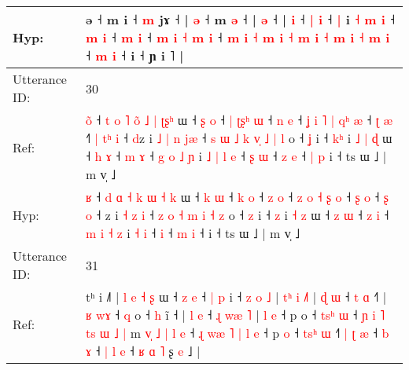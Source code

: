 \documentclass[10pt]{article}
\DeclareRobustCommand{\hl}[1]{{\textcolor{red}{#1}}}
\begin{document}
\begin{longtable}{ll}
Hyp: & ə ˧ m i ˧\hl{}\hl{} \hl{m} jɤ ˧\hl{}\hl{}\hl{}\hl{}\hl{} |\hl{}\hl{} \hl{}\hl{ə} ˧ m \hl{ə} ˧ |\hl{}\hl{}\hl{}\hl{}\hl{}\hl{}\hl{}\hl{} \hl{}\hl{ə} ˧\hl{}\hl{}\hl{}\hl{}\hl{}\hl{}\hl{} |\hl{}\hl{}\hl{}\hl{} \hl{i} ˧ \hl{|} \hl{i} ˧ \hl{|} i\hl{}\hl{} \hl{˧} \hl{m} \hl{i} ˧ \hl{m} \hl{i} ˧ \hl{m} \hl{i} ˧\hl{}\hl{} \hl{m} \hl{i} \hl{˧} \hl{}\hl{m} \hl{i} ˧ \hl{m} \hl{i} \hl{˧} \hl{}\hl{}\hl{m} \hl{i} \hl{˧} \hl{}\hl{}\hl{m} \hl{i} \hl{˧} \hl{}\hl{m} \hl{i} \hl{˧} \hl{m} \hl{i} ˧ \hl{}\hl{m} \hl{i} ˧\hl{}\hl{} i ˧ ɲ i ˥ |
 \\
\midrule
Utterance ID: & 30 \\
Ref: & \hl{o}\hl{̃} ˧ \hl{t} \hl{o} \hl{˥} \hl{o}\hl{̃} \hl{˩} \hl{|} \hl{ʈ}\hl{ʂ}\hl{ʰ} ɯ ˧ \hl{ʂ} \hl{o} ˧\hl{ }\hl{|} \hl{ʈ}\hl{ʂ}\hl{ʰ} \hl{ɯ} ˧ \hl{n} \hl{e} ˧\hl{ }\hl{ʝ} \hl{i} \hl{˥} \hl{|} \hl{q}\hl{ʰ} \hl{æ} ˧ \hl{ʈ} \hl{æ} ˧\hl{˥}\hl{ }\hl{|} \hl{t}\hl{ʰ} \hl{i} ˧ \hl{d}z i\hl{ }\hl{˩} \hl{|} \hl{n} \hl{j}\hl{æ} ˧\hl{ }\hl{s} \hl{ɯ} \hl{˩} \hl{k} \hl{v}\hl{̩} \hl{˩} \hl{|} \hl{l} o ˧ \hl{ʝ} i ˧ \hl{k}\hl{ʰ} i\hl{ }\hl{˩} \hl{|} \hl{ɖ} ɯ ˧ \hl{h} \hl{ɤ} ˧ \hl{m} \hl{ɤ} ˧ \hl{g} \hl{o} \hl{˩} \hl{ɲ} i\hl{ }\hl{˩}\hl{ }\hl{|} \hl{l} \hl{e} ˧\hl{ }\hl{ʂ} \hl{ɯ} ˧ \hl{z} \hl{e} ˧\hl{ }\hl{|}\hl{ }\hl{p} i ˧ ts ɯ ˩ | m v̩ ˩
 \\
Hyp: & \hl{}\hl{ʁ} ˧ \hl{d} \hl{ɑ} \hl{˧} \hl{}\hl{k} \hl{ɯ} \hl{˧} \hl{}\hl{}\hl{k} ɯ ˧ \hl{k} \hl{ɯ} ˧\hl{}\hl{} \hl{}\hl{}\hl{k} \hl{o} ˧ \hl{z} \hl{o} ˧\hl{}\hl{} \hl{z} \hl{o} \hl{˧} \hl{}\hl{ʂ} \hl{o} ˧ \hl{ʂ} \hl{o} ˧\hl{}\hl{}\hl{} \hl{}\hl{ʂ} \hl{o} ˧ \hl{}z i\hl{}\hl{} \hl{˧} \hl{z} \hl{}\hl{i} ˧\hl{}\hl{} \hl{z} \hl{o} \hl{˧} \hl{}\hl{m} \hl{i} \hl{˧} \hl{z} o ˧ \hl{z} i ˧ \hl{}\hl{z} i\hl{}\hl{} \hl{˧} \hl{z} ɯ ˧ \hl{z} \hl{ɯ} ˧ \hl{z} \hl{i} ˧ \hl{m} \hl{i} \hl{˧} \hl{z} i\hl{}\hl{}\hl{}\hl{} \hl{˧} \hl{i} ˧\hl{}\hl{} \hl{i} ˧ \hl{m} \hl{i} ˧\hl{}\hl{}\hl{}\hl{} i ˧ ts ɯ ˩ | m v̩ ˩
 \\
\midrule
Utterance ID: & 31 \\
Ref: & tʰ i ˩˥ |\hl{ }\hl{l}\hl{ }\hl{e} \hl{˧}\hl{ }\hl{ʂ} ɯ ˧ \hl{z} \hl{e} ˧ \hl{|}\hl{ }\hl{p} i ˧ \hl{z} \hl{o} \hl{˩} |\hl{ }\hl{t}\hl{ʰ} \hl{i} \hl{˩}\hl{˥} |\hl{ }\hl{ɖ} \hl{ɯ} ˧ \hl{t} \hl{ɑ} ˧\hl{˥} |\hl{ }\hl{ʁ} \hl{w}\hl{ɤ} ˧ \hl{q} o ˧ \hl{h} i\hl{̃} ˧ |\hl{ }\hl{l} \hl{e} ˧ \hl{ɻ} \hl{w}\hl{æ} \hl{˥} |\hl{ }\hl{l} \hl{e} ˧ p o ˧ \hl{t}\hl{s}\hl{ʰ} \hl{ɯ} ˧\hl{ }\hl{ɲ}\hl{ }\hl{i}\hl{ }\hl{˥}\hl{ }\hl{t}\hl{s}\hl{ }\hl{ɯ}\hl{ }\hl{˩}\hl{ }\hl{|} m\hl{ }\hl{v}\hl{̩}\hl{ }\hl{˩}\hl{ }\hl{|}\hl{ }\hl{l} \hl{e} ˧\hl{ }\hl{ɻ}\hl{ }\hl{w}\hl{æ}\hl{ }\hl{˥}\hl{ }\hl{|} \hl{l} \hl{e} ˧ p \hl{o} ˧ \hl{t}\hl{s}\hl{ʰ} \hl{ɯ} ˧\hl{˥}\hl{ }\hl{|} \hl{ʈ} \hl{æ} ˧ \hl{b} \hl{ɤ} ˧\hl{ }\hl{|}\hl{ }\hl{l} \hl{e} ˧\hl{ }\hl{ʁ}\hl{ }\hl{ɑ}\hl{ }\hl{˥} ʂ \hl{e} ˩ |

\end{longtable}
\end{document}
